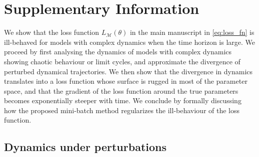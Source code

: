 \newcommand{\perr}{|\nicefrac{(\hat p -\Tilde{p})}{\Tilde{p}}|}
\newcommand{\by}{\textbf{y}}
\newcommand{\AIC}{\text{AIC}}
\newcommand{\M}{\mathcal{M}}

\graphicspath{{./content/part_II/mini-batching/}}

\setcounter{equation}{0}
\setcounter{figure}{0}
\setcounter{table}{0}
\makeatletter %
\renewcommand{\thetable}{S\arabic{table}}
\renewcommand{\theequation}{S\arabic{equation}}
\renewcommand{\thefigure}{S\arabic{figure}}
\makeatother %

\section{Supplementary Information}
\label{secSI:supmat}

We show that the loss function $L_\M(\theta)$ in the main manuscript in \cref{eq:loss_fn} is ill-behaved for models with complex dynamics when the time horizon is large. We proceed by first analysing the dynamics of models with complex dynamics showing chaotic behaviour or limit cycles, and approximate the divergence of perturbed dynamical trajectories. We then show that the divergence in dynamics translates into a loss function whose surface is rugged in most of the parameter space, and that the gradient of the loss function around the true parameters becomes exponentially steeper with time. We conclude by formally discussing how the proposed mini-batch method regularizes the ill-behaviour of the loss function.

\subsection{Dynamics under perturbations}

